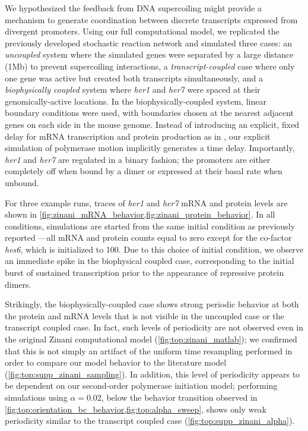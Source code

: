 \documentclass[11pt]{article}
\begin{document}
We hypothesized the feedback from DNA supercoiling might provide a mechanism to generate coordination between discrete transcripts expressed from divergent promoters. Using our full computational model, we replicated the previously developed stochastic reaction network and simulated three cases: an \emph{uncoupled} system where the simulated genes were separated by a large distance (1Mb) to prevent supercoiling interactions, a \emph{transcript-coupled} case where only one gene was active but created both transcripts simultaneously, and a \emph{biophysically coupled} system where \textit{her1} and \textit{her7} were spaced at their genomically-active locations. In the biophysically-coupled system, linear boundary conditions were used, with boundaries chosen at the nearest adjacent genes on each side in the mouse genome. Instead of introducing an explicit, fixed delay for mRNA transcription and protein production as in \parencite{zinaniPairingSegmentationClock2021}, our explicit simulation of polymerase motion implicitly generates a time delay. Importantly, \textit{her1} and \textit{her7} are regulated in a binary fashion; the promoters are either completely off when bound by a dimer or expressed at their basal rate when unbound.

For three example runs, traces of \textit{her1} and \textit{her7} mRNA and protein levels are shown in \cref{fig:zinani_mRNA_behavior,fig:zinani_protein_behavior}. In all conditions, simulations are started from the same initial condition as previously reported \parencite{zinaniPairingSegmentationClock2021}---all mRNA and protein counts equal to zero except for the co-factor \textit{hes6}, which is initialized to 100. Due to this choice of initial condition, we observe an immediate spike in the biophysical coupled case, corresponding to the initial burst of sustained transcription prior to the appearance of repressive protein dimers.

Strikingly, the biophysically-coupled case shows strong periodic behavior at both the protein and mRNA levels that is not visible in the uncoupled case or the transcript coupled case. In fact, such levels of periodicity are not observed even in the original Zinani computational model (\cref{fig:top:zinani_matlab}); we confirmed that this is not simply an artifact of the uniform time resampling performed in order to compare our model behavior to the literature model (\cref{fig:top:supp_zinani_sampling}). In addition, this level of periodicity appears to be dependent on our second-order polymerase initiation model; performing simulations using \(\alpha = 0.02\), below the behavior transition observed in \cref{fig:top:orientation_bc_behavior,fig:top:alpha_sweep}, shows only weak periodicity similar to the transcript coupled case (\cref{fig:top:supp_zinani_alpha}).
\end{document}
